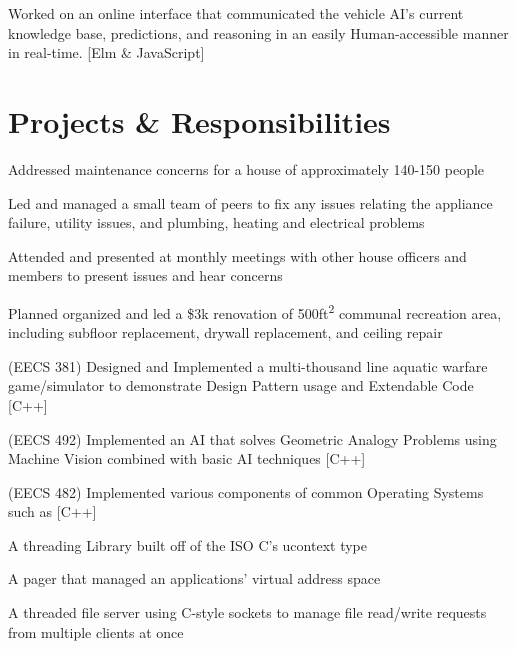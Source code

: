 \documentclass[letterpaper]{headers} %
\begin{document}
\begin{minipage}[t]{0.66\textwidth}
	\sectionspace
	
	\begin{tightitemize}
		\item Worked on an online interface that communicated the vehicle AI's current knowledge base, predictions, and reasoning in an easily Human-accessible manner in real-time. [Elm \& JavaScript]
	\end{tightitemize}

\sectionspace

\section{Projects \& Responsibilities}
	\begin{tightitemize}
		\item Addressed maintenance concerns for a house of approximately 140-150 people
		\item Led and managed a small team of peers to fix any issues relating the appliance failure, utility issues, and plumbing, heating and electrical problems
		\item Attended and presented at monthly meetings with other house officers and members to present issues and hear concerns
		\item Planned organized and led a \$3k renovation of 500ft\textsuperscript{2} communal recreation area, including subfloor replacement, drywall replacement, and ceiling repair
	\end{tightitemize}
	
	\sectionspace
	
	\begin{tightitemize}
		\item (EECS 381) Designed and Implemented a multi-thousand line aquatic warfare game/simulator to demonstrate Design Pattern usage and Extendable Code [C++]
		\item (EECS 492) Implemented an AI that solves Geometric Analogy Problems using Machine Vision combined with basic AI techniques [C++]
		\item (EECS 482) Implemented various components of common Operating Systems such as [C++]\\
		\begin{tightitemize}
			\item A threading Library built off of the ISO C's ucontext type
			\item A pager that managed an applications' virtual address space
			\item A threaded file server using C-style sockets to manage file read/write requests from multiple clients at once
		\end{tightitemize}
	\end{tightitemize}

\end{minipage}
\end{document}
